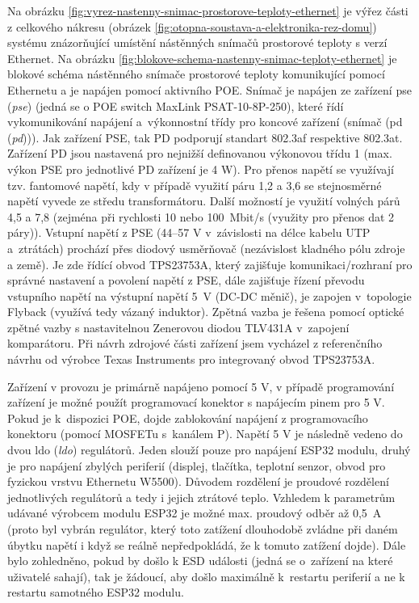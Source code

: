 Na obrázku \ref{fig:vyrez-nastenny-snimac-prostorove-teploty-ethernet} je výřez části z celkového nákresu (obrázek \ref{fig:otopna-soustava-a-elektronika-rez-domu}) systému znázorňující umístění nástěnných snímačů prostorové teploty s verzí Ethernet. Na obrázku \ref{fig:blokove-schema-nastenny-snimac-teploty-ethernet} je blokové schéma nástěnného snímače prostorové teploty komunikující pomocí Ethernetu a je napájen pomocí aktivního POE. Snímač je napájen ze zařízení \acrshort{pse} (\textit{\acrlong{pse}}) (jedná se o POE switch MaxLink PSAT-10-8P-250), které řídí vykomunikování napájení a~výkonnostní třídy pro koncové zařízení (snímač (\acrshort{pd} (\textit{\acrlong{pd}}))). Jak zařízení PSE, tak PD podporují standart 802.3af respektive 802.3at. Zařízení PD jsou nastavená pro nejnižší definovanou výkonovou třídu 1 (max. výkon PSE pro jednotlivé PD zařízení je 4 W). Pro přenos napětí se využívají tzv. fantomové napětí, kdy v případě využití páru 1,2 a 3,6 se stejnosměrné napětí vyvede ze středu transformátoru. Další možností je využití volných párů 4,5 a 7,8 (zejména při rychlosti 10 nebo 100~Mbit/s (využity pro přenos dat 2 páry)). Vstupní napětí z PSE (44–57 V v~závislosti na délce kabelu UTP a~ztrátách) prochází přes diodový usměrňovač (nezávislost kladného pólu zdroje a země). Je zde řídící obvod TPS23753A, který zajišťuje komunikaci/rozhraní pro správné nastavení a povolení napětí z PSE, dále zajišťuje řízení převodu vstupního napětí na výstupní napětí 5~V (DC-DC měnič), je zapojen v~topologie Flyback (využívá tedy vázaný induktor). Zpětná vazba je řešena pomocí optické zpětné vazby s nastavitelnou Zenerovou diodou TLV431A v~zapojení komparátoru. Při návrh zdrojové části zařízení jsem vycházel z referenčního návrhu od výrobce Texas Instruments pro integrovaný obvod TPS23753A.

Zařízení v provozu je primárně  napájeno pomocí 5 V, v případě programování zařízení je možné použít programovací konektor s napájecím pinem pro 5 V. Pokud je k~dispozici POE, dojde zablokování napájení z programovacího konektoru (pomocí MOSFETu s~kanálem P). Napětí 5 V je následně vedeno do dvou \acrshort{ldo} (\textit{\acrlong{ldo}}) regulátorů. Jeden slouží pouze pro napájení ESP32 modulu, druhý je pro napájení zbylých periferií (displej, tlačítka, teplotní senzor, obvod pro fyzickou vrstvu Ethernetu W5500). Důvodem rozdělení je proudové rozdělení jednotlivých regulátorů a tedy i jejich ztrátové teplo. Vzhledem k parametrům udávané výrobcem modulu ESP32 je možné max. proudový odběr až 0,5~A (proto byl vybrán regulátor, který toto zatížení dlouhodobě zvládne při daném úbytku napětí i když se reálně nepředpokládá, že k tomuto zatížení dojde). Dále bylo zohledněno, pokud by došlo k ESD události (jedná se o~zařízení na které uživatelé sahají), tak je žádoucí, aby došlo maximálně k~restartu periferií a ne k restartu samotného ESP32 modulu. 

